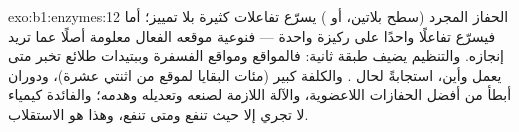 \begin{solution}{exo:b1:enzymes:12}
الحفاز المجرد (سطح بلاتين، أو ) يسرّع تفاعلات كثيرة بلا تمييز؛ أما
 فيسرّع تفاعلًا واحدًا على ركيزة واحدة --- فنوعية موقعه الفعال
معلومة أصلًا عما تريد  إنجازه. والتنظيم يضيف طبقة ثانية:
فالمواقع  ومواقع الفسفرة وببتيدات طلائع  تخبر
 متى يعمل وأين، استجابةً لحال . والكلفة  كبير
(مئات البقايا لموقع من اثنتي عشرة)، ودوران أبطأ من أفضل الحفازات
اللاعضوية، والآلة اللازمة لصنعه وتعديله وهدمه؛ والفائدة كيمياء لا
تجري إلا حيث تنفع ومتى تنفع، وهذا هو الاستقلاب.
\end{solution}

